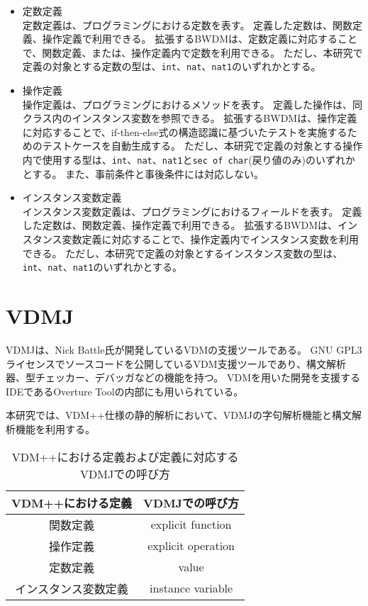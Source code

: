 \documentclass[uplatex, report, a4j, 10pt]{jsbook}
\newcommand\ttt[1]{\texttt{#1}}
\begin{document}
\begin{itemize}
  \item 定数定義\\
        定数定義は、プログラミングにおける定数を表す。
        定義した定数は、関数定義、操作定義で利用できる。
        拡張するBWDMは、定数定義に対応することで、関数定義、または、操作定義内で定数を利用できる。
        ただし、本研究で定義の対象とする定数の型は、\ttt{int}、\ttt{nat}、\ttt{nat1}のいずれかとする。
  \item 操作定義\\
        操作定義は、プログラミングにおけるメソッドを表す。
        定義した操作は、同クラス内のインスタンス変数を参照できる。
        拡張するBWDMは、操作定義に対応することで、if-then-else式の構造認識に基づいたテストを実施するためのテストケースを自動生成する。
        ただし、本研究で定義の対象とする操作内で使用する型は、\ttt{int}、\ttt{nat}、\ttt{nat1}と\ttt{sec of char}(戻り値のみ)のいずれかとする。
        また、事前条件と事後条件には対応しない。
  \item インスタンス変数定義\\
        インスタンス変数定義は、プログラミングにおけるフィールドを表す。
        定義した定数は、関数定義、操作定義で利用できる。
        拡張するBWDMは、インスタンス変数定義に対応することで、操作定義内でインスタンス変数を利用できる。
        ただし、本研究で定義の対象とするインスタンス変数の型は、\ttt{int}、\ttt{nat}、\ttt{nat1}のいずれかとする。
\end{itemize}

\section{VDMJ}\label{sec:vdmj}
VDMJ\cite{vdmj}は、Nick Battle氏が開発しているVDMの支援ツールである。
GNU GPL3ライセンスでソースコードを公開しているVDM支援ツールであり、構文解析器、型チェッカー、デバッガなどの機能を持つ。
VDMを用いた開発を支援するIDEであるOverture Tool\cite{overture}の内部にも用いられている。

本研究では、VDM++仕様の静的解析において、VDMJの字句解析機能と構文解析機能を利用する。

\begin{table}[t]
  \begin{center}
    \caption{VDM++における定義および定義に対応するVDMJでの呼び方}
    \label{tab:vdmj_definition_name}
    \begin{tabular}{c|c}
      VDM++における定義    & VDMJでの呼び方     \\
      \hline
      \hline
      関数定義             & explicit function  \\ \hline
      操作定義             & explicit operation \\ \hline
      定数定義             & value              \\ \hline
      インスタンス変数定義 & instance variable
    \end{tabular}
  \end{center}
\end{table}
\end{document}
